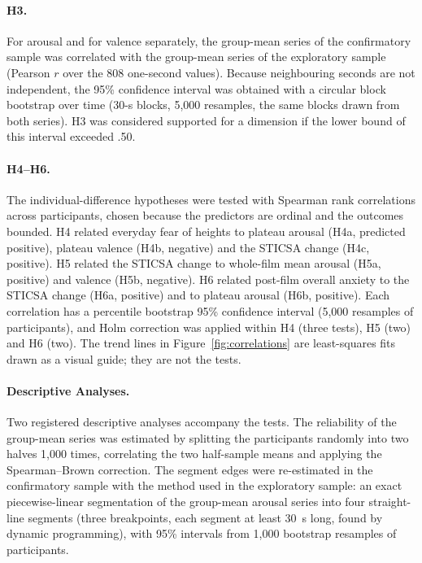 \documentclass[man,floatsintext,12pt,donotrepeattitle]{apa7}
\begin{document}
\paragraph{H3.} For arousal and for valence separately, the group-mean series of the confirmatory sample was
correlated with the group-mean series of the exploratory sample (Pearson $r$ over the 808 one-second values). Because
neighbouring seconds are not independent, the 95\% confidence interval was obtained with a circular block bootstrap
over time (30-s blocks, 5,000 resamples, the same blocks drawn from both series). H3 was considered supported for a
dimension if the lower bound of this interval exceeded .50.

\paragraph{H4--H6.} The individual-difference hypotheses were tested with Spearman rank correlations across
participants, chosen because the predictors are ordinal and the outcomes bounded. H4 related everyday fear of heights
to plateau arousal (H4a, predicted positive), plateau valence (H4b, negative) and the STICSA change (H4c, positive).
H5 related the STICSA change to whole-film mean arousal (H5a, positive) and valence (H5b, negative). H6 related
post-film overall anxiety to the STICSA change (H6a, positive) and to plateau arousal (H6b, positive). Each
correlation has a percentile bootstrap 95\% confidence interval (5,000 resamples of participants), and Holm
correction was applied within H4 (three tests), H5 (two) and H6 (two). The trend lines in
Figure~\ref{fig:correlations} are least-squares fits drawn as a visual guide; they are not the tests.

\paragraph{Descriptive Analyses.} Two registered descriptive analyses accompany the tests. The reliability of the
group-mean series was estimated by splitting the participants randomly into two halves 1,000 times, correlating the
two half-sample means and applying the Spearman--Brown correction. The segment edges were re-estimated in the
confirmatory sample with the method used in the exploratory sample: an exact piecewise-linear segmentation of the
group-mean arousal series into four straight-line segments (three breakpoints, each segment at least 30~s long, found
by dynamic programming), with 95\% intervals from 1,000 bootstrap resamples of participants.
\end{document}
